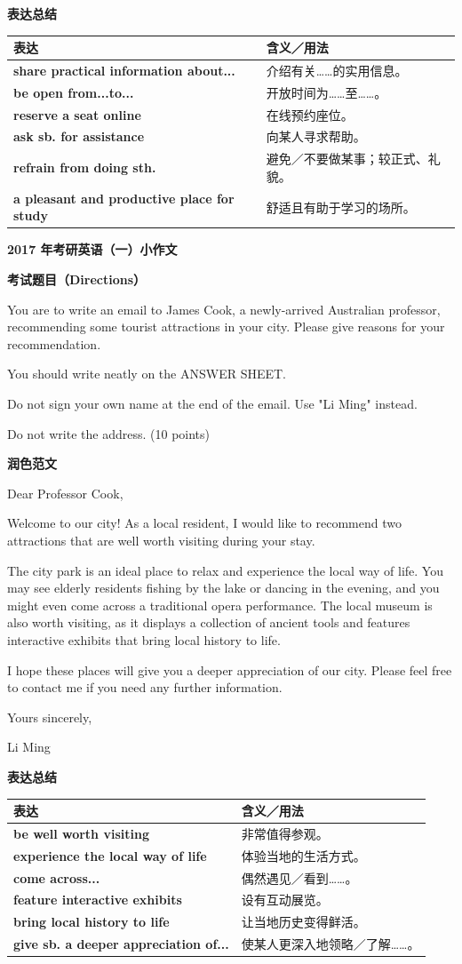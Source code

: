 \documentclass[a4paper,12pt]{article}
\newcommand{\pageheading}[1]{%
  \begin{center}
    {\fontsize{16pt}{20pt}\selectfont\bfseries\color{navy}#1}
  \end{center}
  \vspace{2mm}
}
\newcommand{\sectionlabel}[1]{%
  \vspace{1.5mm}
  {\fontsize{11pt}{14pt}\selectfont\bfseries\color{navy}#1\par}
  \vspace{1mm}
}
\newenvironment{promptbox}{%
  \begin{tcolorbox}[colback=lightgray,colframe=rulegray,boxrule=.35pt,arc=.5mm,
  left=2.2mm,right=2.2mm,top=1.4mm,bottom=1.4mm,before skip=0pt,after skip=1mm]
  \fontsize{11pt}{13.4pt}\selectfont
  \RaggedRight
}{%
  \end{tcolorbox}
}
\newenvironment{essaybody}{%
  \fontsize{14pt}{20pt}\selectfont
  \RaggedRight
  \setlength{\parskip}{5pt}
}{\par}
\newcommand{\expressions}[1]{%
  \sectionlabel{表达总结}
  {\fontsize{10.8pt}{13.2pt}\selectfont
  \begin{tabularx}{\textwidth}{>{\RaggedRight\arraybackslash}p{0.46\textwidth} >{\RaggedRight\arraybackslash}X}
  \toprule
  \textbf{表达} & \textbf{含义／用法}\\
  \midrule
  #1
  \bottomrule
  \end{tabularx}}
}
\newcommand{\exprow}[2]{\textbf{#1} & #2\\}
\begin{document}
\expressions{
\exprow{share practical information about...}{介绍有关……的实用信息。}
\exprow{be open from...to...}{开放时间为……至……。}
\exprow{reserve a seat online}{在线预约座位。}
\exprow{ask sb. for assistance}{向某人寻求帮助。}
\exprow{refrain from doing sth.}{避免／不要做某事；较正式、礼貌。}
\exprow{a pleasant and productive place for study}{舒适且有助于学习的场所。}
}

\newpage
\thispagestyle{fancy}
\pageheading{2017 年考研英语（一）小作文}
\sectionlabel{考试题目（Directions）}
\begin{promptbox}
You are to write an email to James Cook, a newly-arrived Australian professor, recommending some tourist attractions in your city. Please give reasons for your recommendation.

You should write neatly on the ANSWER SHEET.

Do not sign your own name at the end of the email. Use "Li Ming" instead.

Do not write the address. (10 points)
\end{promptbox}

\sectionlabel{润色范文}
\begin{essaybody}
Dear Professor Cook,

Welcome to our city! As a local resident, I would like to recommend two attractions that are well worth visiting during your stay.

The city park is an ideal place to relax and experience the local way of life. You may see elderly residents fishing by the lake or dancing in the evening, and you might even come across a traditional opera performance. The local museum is also worth visiting, as it displays a collection of ancient tools and features interactive exhibits that bring local history to life.

I hope these places will give you a deeper appreciation of our city. Please feel free to contact me if you need any further information.

Yours sincerely,

Li Ming
\end{essaybody}

\expressions{
\exprow{be well worth visiting}{非常值得参观。}
\exprow{experience the local way of life}{体验当地的生活方式。}
\exprow{come across...}{偶然遇见／看到……。}
\exprow{feature interactive exhibits}{设有互动展览。}
\exprow{bring local history to life}{让当地历史变得鲜活。}
\exprow{give sb. a deeper appreciation of...}{使某人更深入地领略／了解……。}
}
\end{document}
